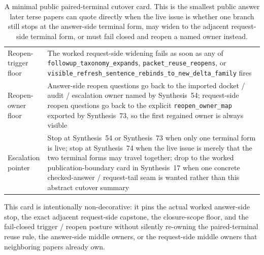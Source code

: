 \documentclass[11pt]{article}
\begin{document}
\begin{table}[t]
\begin{tabularx}{\linewidth}{@{}LY@{}}
Reopen-trigger floor & The worked request-side widening fails as soon as any of \nolinkurl{followup_taxonomy_expands}, \nolinkurl{packet_reuse_reopens}, or \nolinkurl{visible_refresh_sentence_rebinds_to_new_delta_family} fires \\
Reopen-owner floor & Answer-side reopen questions go back to the imported docket / audit / escalation owner named by Synthesis~54; request-side reopen questions go back to the explicit \nolinkurl{reopen_owner_map} exported by Synthesis~73, so the first regained owner is always visible \\
Escalation pointer & Stop at Synthesis~54 or Synthesis~73 when only one terminal form is live; stop at Synthesis~74 when the live issue is merely that the two terminal forms may travel together; drop to the worked publication-boundary card in Synthesis~17 when one concrete checked-answer / request-tail seam is wanted rather than this abstract cutover summary \\
\bottomrule
\end{tabularx}
\caption{A minimal public paired-terminal cutover card. This is the smallest public answer later terse papers can quote directly when the live issue is whether one branch still stops at the answer-side terminal form, may widen to the adjacent request-side terminal form, or must fail closed and reopen a named owner instead.}
\label{tab:minimal-public-paired-terminal-cutover-card}
\end{table}

This card is intentionally non-decorative: it pins the actual worked answer-side stop, the exact adjacent request-side capstone, the closure-scope floor, and the fail-closed trigger / reopen posture without silently re-owning the paired-terminal reuse rule, the answer-side middle owners, or the request-side middle owners that neighboring papers already own.\cite{series:workedexample}
\end{document}
